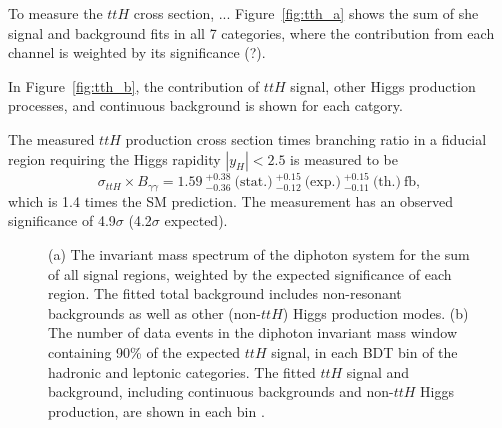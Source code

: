 \documentclass{moriond}
\begin{document}
To measure the $ttH$ cross section, ...
Figure~\ref{fig:tth_a} shows the sum of she signal and background fits in all 7 categories, where
the contribution from each channel is weighted by its significance (?).

In Figure~\ref{fig:tth_b}, the contribution of $ttH$ signal, other Higgs
production processes, and continuous background is shown for each catgory.

The measured $ttH$ production cross section times branching ratio in a fiducial region requiring the
Higgs rapidity $|y_H|<2.5$ is measured to be
%
\begin{equation}
\sigma_{ttH} \times B_{\gamma\gamma} = 1.59~^{+0.38}_{-0.36} ~\textrm{(stat.)}
~^{+0.15}_{-0.12} ~\textrm{(exp.)}
~^{+0.15}_{-0.11} ~\textrm{(th.)}~\textrm{fb},
\end{equation}
%
which is 1.4 times the SM prediction.
The measurement has an observed significance of 4.9$\sigma$ (4.2$\sigma$ expected).

\begin{figure}[!htbp]
  \centering
  \caption{
    (a) The invariant mass spectrum of the diphoton system for the sum of all signal regions, weighted
    by the expected significance of each region. The fitted total background includes non-resonant
    backgrounds as well as other (non-$ttH$) Higgs production modes.
    (b) The number of data events in the diphoton invariant mass window containing 90\% of the expected
    $ttH$ signal, in each BDT bin of the hadronic and leptonic categories.
    The fitted $ttH$ signal and background, including continuous backgrounds and non-$ttH$ Higgs
    production, are shown in each bin \cite{ATLAS-CONF-2019-004}.
  }
  \label{fig:tth}
\end{figure}
\end{document}

